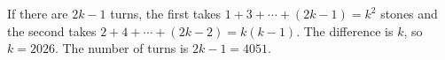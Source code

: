 If there are $2k-1$ turns, the first takes $1+3+\cdots+(2k-1)=k^2$ stones and the second takes $2+4+\cdots+(2k-2)=k(k-1)$. The difference is $k$, so $k=2026$. The number of turns is $2k-1=\boxed{4051}$.
